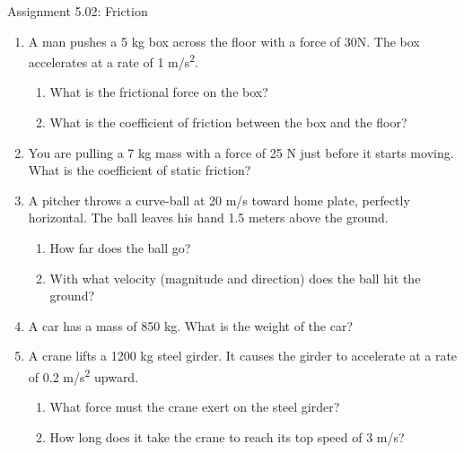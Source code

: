 \documentclass[letterpaper, 12pt]{article}
\begin{document}


\begin{center} Assignment 5.02: Friction
\end{center}
\vspace{-.3in}
\begin{enumerate}
\item A man pushes a 5 kg box across the floor with a force of 30N.  The box accelerates at a rate of 1 m/s\textsuperscript{2}.  
\begin{enumerate}
	\item What is the frictional force on the box?
	\vspace{0.4in}
	\item What is the coefficient of friction between the box and the floor?
	\vspace{0.4in}
\end{enumerate}

\item You are pulling a 7 kg mass with a force of 25 N just before it starts moving.  What is the coefficient of static friction?
\vspace{0.6in}

\item  A pitcher throws a curve-ball at 20 m/s toward home plate, perfectly horizontal.  The ball leaves his hand 1.5 meters above the ground.  
\begin{enumerate}
	\item How far does the ball go?
	\vspace{0.4in}
	\item With what velocity (magnitude and direction) does the ball hit the ground?
	\vspace{0.4in}
\end{enumerate}


\item A car has a mass of 850 kg.  What is the weight of the car?
\vspace{0.4in}


\item A crane lifts a 1200 kg steel girder.  It causes the girder to accelerate at a rate of 0.2 m/s\textsuperscript{2} upward. 
\begin{enumerate}
	\item What force must the crane exert on the steel girder?
	\vspace{0.4in}
	\item How long does it take the crane to reach its top speed of 3 m/s?


\end{enumerate}
\end{enumerate}
\end{document}

